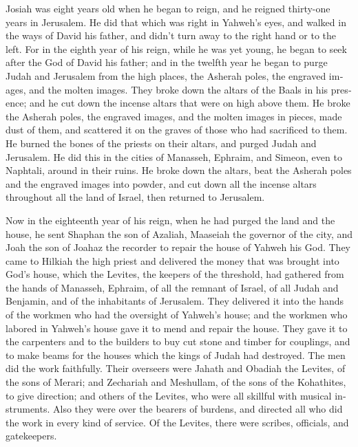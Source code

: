 \begin{paracol}{2}
\begin{otherlanguage}{english}
 Josiah was eight years old when he began to reign, and he
reigned thirty-one years in Jerusalem.  He did that which
was right in Yahweh's eyes, and walked in the ways of David his father,
and didn't turn away to the right hand or to the left. 
For in the eighth year of his reign, while he was yet young, he began to
seek after the God of David his father; and in the twelfth year he began
to purge Judah and Jerusalem from the high places, the Asherah poles,
the engraved images, and the molten images.  They broke
down the altars of the Baals in his presence; and he cut down the
incense altars that were on high above them. He broke the Asherah poles,
the engraved images, and the molten images in pieces, made dust of them,
and scattered it on the graves of those who had sacrificed to them.
 He burned the bones of the priests on their altars, and
purged Judah and Jerusalem.  He did this in the cities of
Manasseh, Ephraim, and Simeon, even to Naphtali, around in their ruins.
 He broke down the altars, beat the Asherah poles and the
engraved images into powder, and cut down all the incense altars
throughout all the land of Israel, then returned to Jerusalem.

 Now in the eighteenth year of his reign, when he had
purged the land and the house, he sent Shaphan the son of Azaliah,
Maaseiah the governor of the city, and Joah the son of Joahaz the
recorder to repair the house of Yahweh his God.  They came
to Hilkiah the high priest and delivered the money that was brought into
God's house, which the Levites, the keepers of the threshold, had
gathered from the hands of Manasseh, Ephraim, of all the remnant of
Israel, of all Judah and Benjamin, and of the inhabitants of Jerusalem.
 They delivered it into the hands of the workmen who had
the oversight of Yahweh's house; and the workmen who labored in Yahweh's
house gave it to mend and repair the house.  They gave it
to the carpenters and to the builders to buy cut stone and timber for
couplings, and to make beams for the houses which the kings of Judah had
destroyed.  The men did the work faithfully. Their
overseers were Jahath and Obadiah the Levites, of the sons of Merari;
and Zechariah and Meshullam, of the sons of the Kohathites, to give
direction; and others of the Levites, who were all skillful with musical
instruments.  Also they were over the bearers of burdens,
and directed all who did the work in every kind of service. Of the
Levites, there were scribes, officials, and gatekeepers.


\end{otherlanguage}
\end{paracol}
